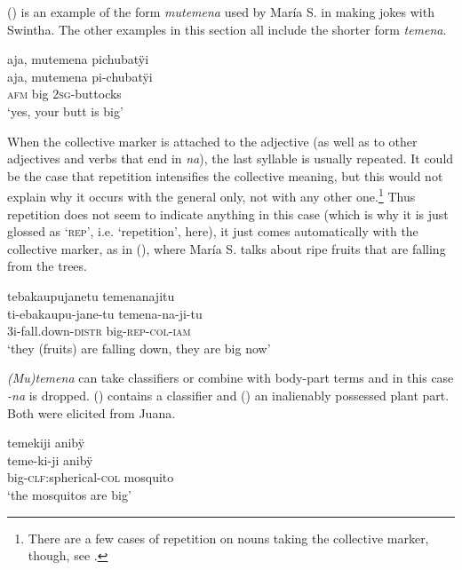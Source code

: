 () is an example of the form \textit{mutemena} used by María S. in making jokes with Swintha. The other examples in this section all include the shorter form \textit{temena}.

\ea\label{ex:temena-1}
\begingl
\glpreamble aja, mutemena pichubatÿi\\
\gla aja, mutemena pi-chubatÿi\\
\glb \textsc{afm} big 2\textsc{sg}-buttocks\\
\glft ‘yes, your butt is big’
\endgl
\trailingcitation{[rxx-e121128s-4x.107]}
\xe

When the collective marker is attached to the adjective (as well as to other adjectives and verbs that end in \textit{na}), the last syllable is usually repeated. It could be the case that repetition intensifies the collective meaning, but this would not explain why it occurs with the general  only, not with any other one.\footnote{There are a few cases of repetition on nouns taking the collective marker, though, see .} Thus repetition does not seem to indicate anything in this case (which is why it is just glossed as ‘\textsc{rep}’, i.e. ‘repetition’, here), it just comes automatically with the collective marker, as in (), where María S. talks about ripe fruits that are falling from the trees. 

\ea\label{ex:ADJ-big-1}
\begingl
\glpreamble tebakaupujanetu temenanajitu\\
\gla ti-ebakaupu-jane-tu temena-na-ji-tu\\
\glb 3i-fall.down-\textsc{distr} big-\textsc{rep}-\textsc{col}-\textsc{iam}\\
\glft ‘they (fruits) are falling down, they are big now’
\endgl
\trailingcitation{[rxx-e121128s-3.07]}
\xe
{}

\textit{(Mu)temena} can take classifiers or combine with body-part terms and in this case \textit{-na} is dropped. () contains a classifier and () an inalienably possessed plant part. Both were elicited from Juana.

\ea\label{ex:ADJ-big-2}
\begingl
\glpreamble temekiji anibÿ\\
\gla teme-ki-ji anibÿ\\
\glb big-\textsc{clf:}spherical-\textsc{col} mosquito\\
\glft ‘the mosquitos are big’
\endgl
\trailingcitation{[jxx-e150925l-1.187]}
\xe

